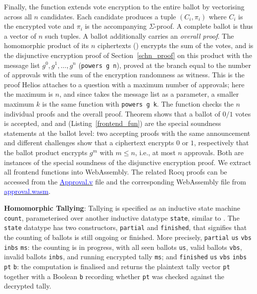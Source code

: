 Finally, the function \texttt{} extends vote encryption to the entire ballot by vectorising across all $n$ candidates. Each candidate 
produces a tuple $(C_i, \pi_i)$ where $C_i$ is the encrypted vote and $\pi_i$ is the accompanying $\Sigma$-proof. A complete ballot is thus a vector of $n$ such tuples. A ballot additionally carries an \emph{overall proof}. The homomorphic product of its $n$ ciphertexts (\texttt{}) encrypts the sum of the votes, and \texttt{} is the disjunctive encryption proof of Section~\ref{schn_proof} on this product with the message list $g^0, g^1, \ldots, g^n$ (\texttt{powers g n}), proved at the branch equal to the number of approvals with the sum of the encryption randomness as witness. This is the proof Helios attaches to a question with a maximum number of approvals; here the maximum is $n$, and since \texttt{} takes the message list as a parameter, a smaller maximum $k$ is the same function with \texttt{powers g k}. The function \texttt{} checks the $n$ individual proofs and the overall proof. Theorem \texttt{} shows that a ballot of $0/1$ votes is accepted, and \texttt{} and \texttt{} (Listing~\ref{frontend_fun}) are the special soundness statements at the ballot level: two accepting proofs with the same announcement and different challenges show that a ciphertext encrypts $0$ or $1$, respectively that the ballot product encrypts $g^m$ with $m \le n$, i.e., at most $n$ approvals. Both are instances of the special soundness of the disjunctive encryption proof. We extract all frontend functions into WebAssembly. The related Rocq proofs can be accessed from the \href{https://anonymous.4open.science/r/SigmaProtocol-EBA5/src/Frontend/Approval.v}{\textcolor{blue}{Approval.v}} file and the corresponding WebAssembly file from \href{https://anonymous.4open.science/r/SigmaProtocol-EBA5/src/Wasm/approval.wasm}{\textcolor{blue}{approval.wasm}}.





\textbf{Homomorphic Tallying}: Tallying is specified as an inductive state machine \texttt{count}, parameterised 
over another inductive datatype \texttt{state}, similar to \cite{10.1007/978-3-319-66107-0_26}. The \texttt{state} datatype has two constructors, \texttt{partial} and \texttt{finished}, that signifies that the counting of ballots is still ongoing or finished. More precisely, \texttt{partial} \texttt{us} \texttt{vbs} \texttt{inbs} \texttt{ms}: the counting is in progress, with all seen ballots \texttt{us}, valid ballots \texttt{vbs}, invalid ballots \texttt{inbs}, and running encrypted tally \texttt{ms}; and \texttt{finished} \texttt{us} \texttt{vbs} \texttt{inbs} \texttt{pt} \texttt{b}: the computation is finalised and returns the plaintext tally vector \texttt{pt} together with a Boolean \texttt{b} recording whether \texttt{pt} was checked against the decrypted tally.

